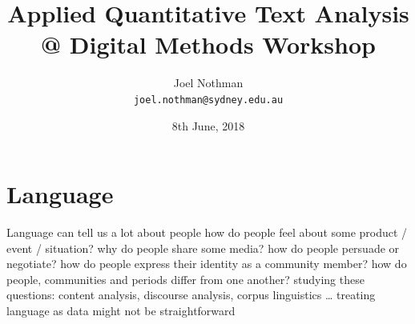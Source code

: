 \usepackage{tikz-dependency}

\title[Digital Methods]{Applied Quantitative Text Analysis\\@ Digital Methods Workshop}

\author[Joel Nothman]{Joel Nothman\\\texttt{\small joel.nothman@sydney.edu.au}}
\date{8th June, 2018}


\usepackage{LI}

\newcommand{\ex}[1]{\textcolor{usydblue}{#1}}
\newcommand{\glow}[1]{\textcolor{usydred}{#1}}

\usepackage{stackengine}
\usepackage{scalerel}
\usepackage{xcolor}
\newcommand\dangersign[1][2ex]{%
  \renewcommand\stacktype{L}%
  \scaleto{\stackon[1.3pt]{\color{red}$\triangle$}{\tiny\bfseries !}}{#1}%
}



\titleslide

\section{Language}

\begin{points}{Language can tell us a lot about people}
	\p how do people \glow{feel} about some product / event / situation?
	\p why do people \glow{share} some media?
	\p how do people \glow{persuade} or negotiate?
	\p how do people express their \glow{identity} as a community member?
	\p how do people, communities and periods \glow{differ} from one another?
	\vfill
	\p studying these questions: content analysis, discourse analysis, corpus linguistics \ldots
	\vfill
	\p treating language as data might not be straightforward
	\vfill
\end{points}

